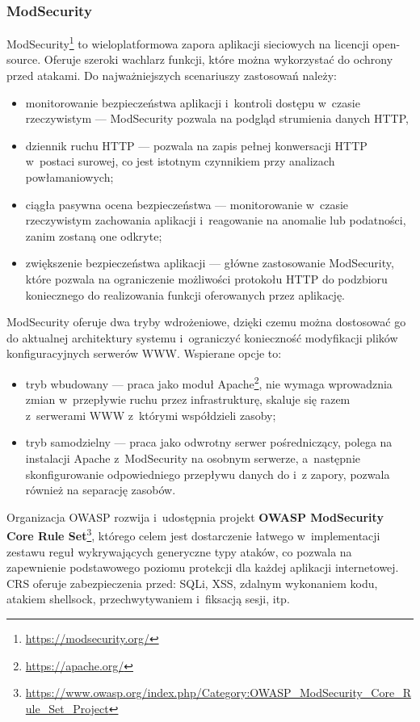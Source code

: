\documentclass[12pt,a4paper,polish,thesis]{dcsbook}
\begin{document}
\subsubsection{ModSecurity}
ModSecurity\footnote{\url{https://modsecurity.org/}} to wieloplatformowa zapora aplikacji sieciowych na licencji open-source. Oferuje szeroki wachlarz funkcji, które można wykorzystać do ochrony przed atakami. Do najważniejszych scenariuszy zastosowań należy:
\begin{itemize} 
\item monitorowanie bezpieczeństwa aplikacji i~kontroli dostępu w~czasie rzeczywistym --- ModSecurity pozwala na podgląd strumienia danych HTTP,
\item dziennik ruchu HTTP --- pozwala na zapis pełnej konwersacji HTTP w~postaci surowej, co jest istotnym czynnikiem przy analizach powłamaniowych;
\item ciągła pasywna ocena bezpieczeństwa --- monitorowanie w~czasie rzeczywistym zachowania aplikacji i~reagowanie na anomalie lub podatności, zanim zostaną one odkryte;
\item zwiększenie bezpieczeństwa aplikacji --- główne zastosowanie ModSecurity, które pozwala na ograniczenie możliwości protokołu HTTP do podzbioru koniecznego do realizowania funkcji oferowanych przez aplikację.
\end{itemize}

ModSecurity oferuje dwa tryby wdrożeniowe, dzięki czemu można dostosować go do aktualnej architektury systemu i~ograniczyć konieczność modyfikacji plików konfiguracyjnych serwerów WWW. Wspierane opcje to:
\begin{itemize}
\item tryb wbudowany --- praca jako moduł Apache\footnote{\url{https://apache.org/}}, nie wymaga wprowadznia zmian w~przepływie ruchu przez infrastrukturę, skaluje się razem z~serwerami WWW z~którymi współdzieli zasoby;
\item tryb samodzielny --- praca jako odwrotny serwer pośredniczący, polega na instalacji Apache z~ModSecurity na osobnym serwerze, a~następnie skonfigurowanie odpowiedniego przepływu danych do i~z zapory, pozwala również na separację zasobów.
\end{itemize}

Organizacja OWASP rozwija i~udostępnia projekt \textbf{OWASP ModSecurity Core Rule Set}\footnote{\url{https://www.owasp.org/index.php/Category:OWASP_ModSecurity_Core_Rule_Set_Project}}, którego celem jest dostarczenie łatwego w~implementacji zestawu reguł wykrywających generyczne typy ataków, co pozwala na zapewnienie podstawowego poziomu protekcji dla każdej aplikacji internetowej. CRS oferuje zabezpieczenia przed: SQLi, XSS, zdalnym wykonaniem kodu, atakiem shellsock, przechwytywaniem i~fiksacją sesji, itp.
\end{document}
